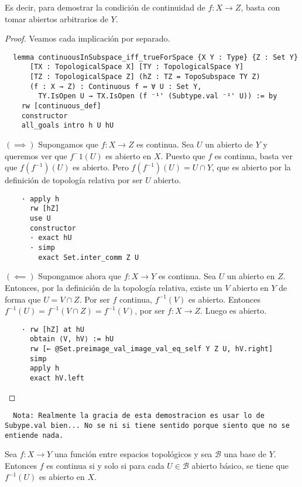 Es decir, para demostrar la condición de continuidad de $f : X \to Z$, basta con tomar abiertos arbitrarios de $Y$.

\begin{proof}
  Veamos cada implicación por separado.

  \begin{lstlisting}
  lemma continuousInSubspace_iff_trueForSpace {X Y : Type} {Z : Set Y}
      [TX : TopologicalSpace X] [TY : TopologicalSpace Y]
      [TZ : TopologicalSpace Z] (hZ : TZ = TopoSubspace TY Z)
      (f : X → Z) : Continuous f ↔ ∀ U : Set Y,
        TY.IsOpen U → TX.IsOpen (f ⁻¹' (Subtype.val ⁻¹' U)) := by
    rw [continuous_def]
    constructor
    all_goals intro h U hU \end{lstlisting}

  $(\implies)$ Supongamos que $f : X \to Z$ es continua. Sea $U$ un abierto de $Y$ y queremos ver que $f^-1(U)$ es abierto en $X$. Puesto que $f$ es continua, basta ver que $f(f^{-1})(U)$ es abierto. Pero $f(f^{-1})(U) = U \cap Y$, que es abierto por la definición de topología relativa por ser $U$ abierto.

  \begin{lstlisting}
    · apply h
      rw [hZ]
      use U
      constructor
      · exact hU
      · simp
        exact Set.inter_comm Z U \end{lstlisting}

  $(\impliedby)$ Supongamos ahora que $f : X \to Y$ es continua. Sea $U$ un abierto en $Z$. Entonces, por la definición de la topología relativa, existe un $V$ abierto en $Y$ de forma que $U = V \cap Z$. Por ser $f$ continua, $f^{-1}(V)$ es abierto. Entonces $f^{-1}(U) = f^{-1}(V \cap Z) = f^{-1}(V)$, por ser $f : X \to Z$. Luego es abierto.

  \begin{lstlisting}
    · rw [hZ] at hU
      obtain ⟨V, hV⟩ := hU
      rw [← @Set.preimage_val_image_val_eq_self Y Z U, hV.right]
      simp
      apply h
      exact hV.left
  \end{lstlisting}
  
\end{proof}

\begin{lstlisting}
  Nota: Realmente la gracia de esta demostracion es usar lo de Subype.val bien... No se ni si tiene sentido porque siento que no se entiende nada.
\end{lstlisting}

\begin{proposition}
  Sea $f : X \to Y$ una función entre espacios topológicos y sea $\mathcal{B}$ una base de $Y$. Entonces $f$ es continua si y solo si para cada $U \in \mathcal{B}$ abierto básico, se tiene que $f^{-1}(U)$ es abierto en $X$.
\end{proposition}

